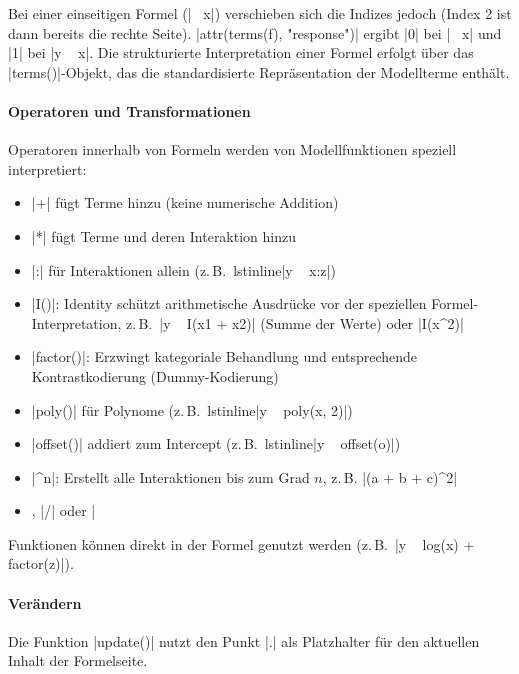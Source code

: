 \documentclass[10pt,twocolumn]{scrartcl}
\renewcommand{\lstinline}{\mycoloredinline}
\begin{document}
Bei einer einseitigen Formel (\lstinline|~ x|) verschieben sich die Indizes jedoch (Index 2 ist dann bereits die rechte Seite). \lstinline|attr(terms(f), "response")| ergibt \lstinline|0| bei \lstinline|~ x| und \lstinline|1| bei \lstinline|y ~ x|. Die strukturierte Interpretation einer Formel erfolgt über das \lstinline|terms()|-Objekt, das die standardisierte Repräsentation der Modellterme enthält.

\paragraph{Operatoren und Transformationen}

Operatoren innerhalb von Formeln werden von Modellfunktionen speziell interpretiert:
\begin{itemize}
\item \lstinline|+| fügt Terme hinzu (keine numerische Addition)
\item \lstinline|*| fügt Terme und deren Interaktion hinzu
\item \lstinline|:| für Interaktionen allein (z.\,B.\ lstinline|y ~ x:z|)
\item \lstinline|I()|: Identity schützt arithmetische Ausdrücke vor der speziellen Formel-Interpretation, z.\,B.\ \lstinline|y ~ I(x1 + x2)| (Summe der Werte) oder \lstinline|I(x^2)|
\item \lstinline|factor()|: Erzwingt kategoriale Behandlung und entsprechende Kontrastkodierung (Dummy-Kodierung)
\item \lstinline|poly()| für Polynome (z.\,B.\ lstinline|y ~ poly(x, 2)|)
\item \lstinline|offset()| addiert zum Intercept (z.\,B.\ lstinline|y ~ offset(o)|)
\item \lstinline|^n|: Erstellt alle Interaktionen bis zum Grad $n$, z.\,B. \lstinline|(a + b + c)^2|
\item \lstinline{|}, \lstinline|/| oder \lstinline|%in%| für geschachtelte Effekte (z. B. in gemischten oder hierarchischen Modellen)
\end{itemize}

Funktionen können direkt in der Formel genutzt werden (z.\,B.\ \lstinline|y ~ log(x) + factor(z)|).

\paragraph{Verändern}

Die Funktion \lstinline|update()| nutzt den Punkt \lstinline|.| als Platzhalter für den aktuellen Inhalt der Formelseite.
\end{document}
